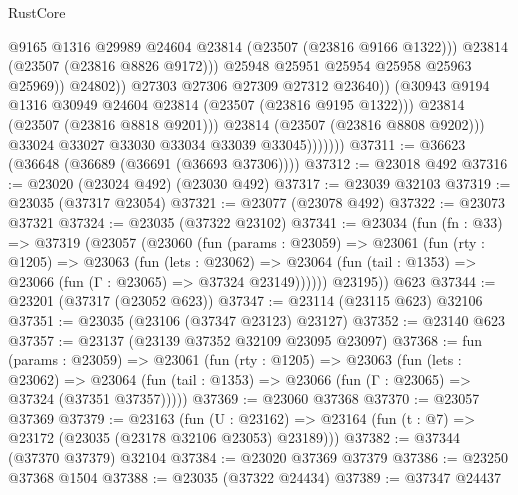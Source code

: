 \begin{lexlean}{RustCore}
\begin{coremodule}
                                      @9165
                                      @1316
                                      @29989
                                      @24604
                                      @23814
                                      (@23507 (@23816 @9166 @1322)))
                                    @23814
                                    (@23507 (@23816 @8826 @9172)))
                                  @25948
                                  @25951
                                  @25954
                                  @25958
                                  @25963
                                  @25969))
                              @24802))
                          @27303
                          @27306
                          @27309
                          @27312
                          @23640))
                      (@30943 @9194 @1316 @30949 @24604 @23814 (@23507 (@23816 @9195 @1322)))
                      @23814
                      (@23507 (@23816 @8818 @9201)))
                    @23814
                    (@23507 (@23816 @8808 @9202)))
                  @33024
                  @33027
                  @33030
                  @33034
                  @33039
                  @33045)))))))
@37311 := @36623 (@36648 (@36689 (@36691 (@36693 @37306))))
@37312 := @23018 @492
@37316 := @23020 (@23024 @492) (@23030 @492)
@37317 := @23039 @32103
@37319 := @23035 (@37317 @23054)
@37321 := @23077 (@23078 @492)
@37322 := @23073 @37321
@37324 := @23035 (@37322 @23102)
@37341 := @23034
    (fun (fn : @33) =>
    @37319
      (@23057
        (@23060
          (fun (params : @23059) =>
          @23061
            (fun (rty : @1205) =>
            @23063
              (fun (lets : @23062) =>
              @23064 (fun (tail : @1353) => @23066 (fun (Γ : @23065) => @37324 @23149))))))
        @23195))
    @623
@37344 := @23201 (@37317 (@23052 @623))
@37347 := @23114 (@23115 @623) @32106
@37351 := @23035 (@23106 (@37347 @23123) @23127)
@37352 := @23140 @623
@37357 := @23137 (@23139 @37352 @32109 @23095 @23097)
@37368 := fun (params : @23059) =>
  @23061
    (fun (rty : @1205) =>
    @23063
      (fun (lets : @23062) =>
      @23064 (fun (tail : @1353) => @23066 (fun (Γ : @23065) => @37324 (@37351 @37357)))))
@37369 := @23060 @37368
@37370 := @23057 @37369
@37379 := @23163
    (fun (U : @23162) => @23164 (fun (t : @7) => @23172 (@23035 (@23178 @32106 @23053) @23189)))
@37382 := @37344 (@37370 @37379) @32104
@37384 := @23020 @37369 @37379
@37386 := @23250 @37368 @1504
@37388 := @23035 (@37322 @24434)
@37389 := @37347 @24437

\end{coremodule}
\end{lexlean}
